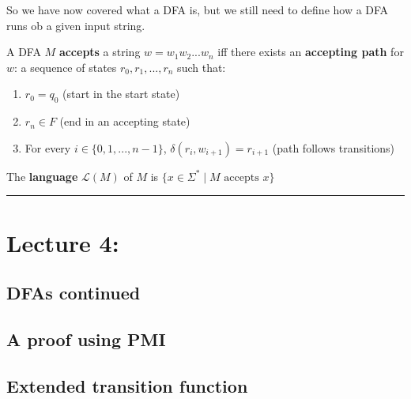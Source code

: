 \documentclass[11pt]{article}
\begin{document}
So we have now covered what a DFA is, but we still need to define how a DFA runs ob a given input string.

\begin{tcolorbox} [title= Definition:, colback=black!10!white]
    A DFA $M$ \textbf{accepts} a string $w=w_1w_2...w_n$ iff there exists an \textbf{accepting path} for $w$: a sequence of states $r_0,r_1,...,r_n$ such that:
    \begin{enumerate}
        \item $r_0=q_0$ (start in the start state)
        \item $r_n\in F$ (end in an accepting state)
        \item For every $i\in\{0,1,...,n-1\}$, $\delta(r_i,w_{i+1})=r_{i+1}$ (path follows transitions)\footnotemark{}
    \end{enumerate}
\end{tcolorbox}



\begin{tcolorbox} [title= Definition:, colback=black!10!white]
    The \textbf{language} $\mathcal{L}(M)$ of $M$ is $\{x\in\Sigma^*\mid M \text{ accepts }x\}$
\end{tcolorbox}

\begin{center}
	\rule{450pt}{1pt} 
\end{center}
\newpage

\section*{Lecture 4:}

\subsection*{DFAs continued}

\subsection*{A proof using PMI}

\subsection*{Extended transition function}
\end{document}
